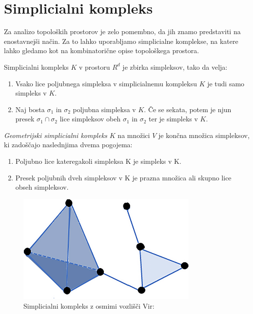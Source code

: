 \section{Simplicialni kompleks}
Za analizo topoloških prostorov je zelo pomembno, da jih znamo predstaviti na enostavnejši način. Za to lahko uporabljamo simplicialne komplekse, na katere lahko gledamo kot na kombinatorične opise topološkega prostora. \\
\begin{definicija}
Simplicialni kompleks \(K\) v prostoru \(R^d\) je zbirka simpleksov, tako da velja:
    \begin{enumerate}
    \item Vsako lice poljubnega simpleksa v simplicialnemu kompleksu \(K\) je tudi samo simpleks v \(K\).
    \item Naj bosta \(\sigma_1\) in \(\sigma_2\) poljubna simpleksa v \(K\). \v{C}e se sekata, potem je njun presek \(\sigma_1 \cap \sigma_2\) lice simpleksov obeh \(\sigma_1\) in \(\sigma_2\) ter je simpleks v \(K\).
\end{enumerate}
\end{definicija}

\begin{definicija}
    \textit{Geometrijski simplicialni kompleks $K$} na množici $V$ je končna množica simpleksov, ki zadoščajo naslednjima dvema pogojema:
    \begin{enumerate}
        \item Poljubno lice kateregakoli simpleksa K je simpleks v K.
        \item Presek poljubnih dveh simpleksov v K je prazna množica ali skupno lice obseh simpleksov.
    \end{enumerate}
\end{definicija}

\begin{figure}[H]
    \centering
    \includegraphics[width=0.8\textwidth]{slike/Simplicial-complex-eight-vertices.png}
    \caption{Simplicialni kompleks z osmimi vozlišči Vir: \cite{researchgate_simplicial_complex}}
    \label{fig:your-label}
\end{figure}

